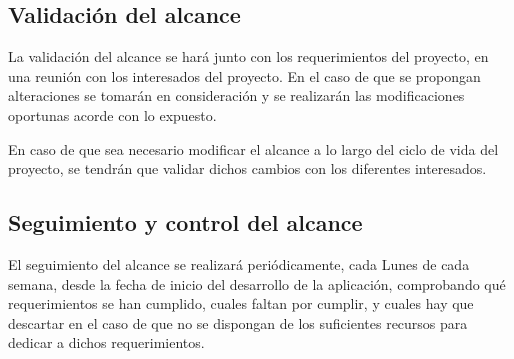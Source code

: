 \subsection{Validación del alcance}
La validación del alcance se hará junto con los requerimientos del proyecto,
en una reunión con los interesados del proyecto. En el caso de que se propongan
alteraciones se tomarán en consideración y se realizarán las modificaciones
oportunas acorde con lo expuesto.

En caso de que sea necesario modificar el alcance a lo largo del ciclo de
vida del proyecto, se tendrán que validar dichos cambios con los diferentes
interesados.

\subsection{Seguimiento y control del alcance}
\label{subsec:syc:scope}
El seguimiento del alcance se realizará periódicamente, cada Lunes de cada
semana, desde la fecha de inicio del desarrollo de la aplicación, comprobando
qué requerimientos se han cumplido, cuales faltan por cumplir, y cuales hay
que descartar en el caso de que no se dispongan de los suficientes recursos
para dedicar a dichos requerimientos.
